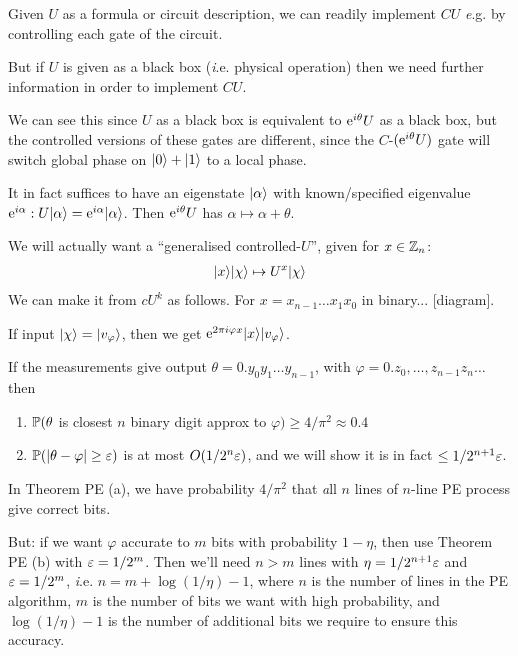 \documentclass[]{article}
\renewcommand{\it}[1]{\textit{#1}}
\renewcommand{\phi}{\varphi}
\begin{document}
\begin{remark*}
Given $U$ as a formula or circuit description, we can readily implement $CU$ {\it e.g.} by controlling each gate of the circuit.

But if $U$ is given as a black box ({\it i.e.} physical operation) then we need further information in order to implement $CU$.

We can see this since $U$ as a black box is equivalent to $\e^{i\theta}U$ as a black box, but the controlled versions of these gates are different, since the $C$-$(\e^{i\theta}U)$ gate will switch global phase on $\ket{0} + \ket{1}$ to a local phase.

It in fact suffices to have an eigenstate $\ket{\alpha}$ with known/specified eigenvalue $\e^{i\alpha}: U\ket{\alpha} = \e^{i\alpha}\ket{\alpha}$. Then $\e^{i\theta}U$ has $\alpha \mapsto \alpha + \theta$.
\end{remark*}


We will actually want a ``generalised controlled-$U$'', given for $x \in \Z_n$:
\begin{align*}
	{\ket{x}}\ket{\chi} \mapsto U^x\ket{\chi}
\end{align*}
We can make it from $cU^k$ as follows. For $x = x_{n-1}\dots x_1x_0$ in binary... [diagram].

If input $\ket{\chi} = \ket{v_\phi}$, then we get $\e^{2\pi i\phi x}\ket{x}\ket{v_\phi}$.


\begin{theorem*}[PE]
If the measurements give output $\theta = 0.y_0y_1\dots y_{n-1}$, with $\phi = 0.z_0,\dots,z_{n-1}z_{n}\dots$ then
\begin{enumerate}[label=(\alph*)]
	\item $\P(\theta$ is closest $n$ binary digit approx to $\phi) \ge 4/\pi^2 \approx 0.4$
	\item $\P(|\theta - \phi| \ge \eps)$ is at most $O(1/2^n\eps)$, and we will show it is in fact $\le 1/2^{n+1}\eps$.
\end{enumerate}
\end{theorem*}

\begin{remark*}
In Theorem PE (a), we have probability $4/\pi^2$ that {\it all} $n$ lines of $n$-line PE process give correct bits.

But: if we want $\phi$ accurate to $m$ bits with probability $1 - \eta$, then use Theorem PE (b) with $\eps = 1/2^m$. Then we'll need $n > m$ lines with $\eta = 1/2^{n+1}\eps$ and $\eps = 1/2^m$, {\it i.e.} $n = m + \log (1/\eta) -1$, where $n$ is the number of lines in the PE algorithm, $m$ is the number of bits we want with high probability, and $\log(1/\eta) -1 $ is the number of additional bits we require to ensure this accuracy.
\end{remark*}
\end{document}
